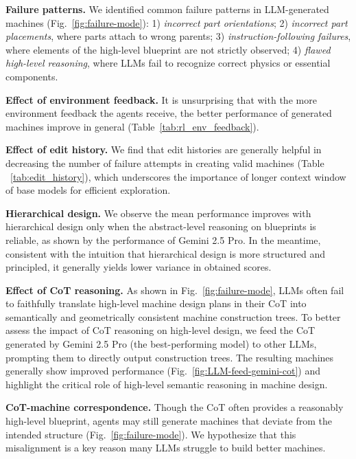 \documentclass{article} %
\theoremstyle{plain}
\theoremstyle{definition}
\begin{document}
\textbf{Failure patterns.} We identified common failure patterns in LLM-generated machines (Fig.~\ref{fig:failure-mode}): 1) \textit{incorrect part orientations}; 2) \textit{incorrect part placements}, where parts attach to wrong parents; 3) \textit{instruction-following failures}, where elements of the high-level blueprint are not strictly observed; 4) \textit{flawed high-level reasoning}, where LLMs fail to recognize correct physics or essential components.



\textbf{Effect of environment feedback.} It is unsurprising that with the more environment feedback the agents receive, the better performance of generated machines improve in general (Table~\ref{tab:rl_env_feedback}).


\textbf{Effect of edit history.} We find that edit histories are generally helpful in decreasing the number of failure attempts in creating valid machines (Table ~\ref{tab:edit_history}), which underscores the importance of longer context window of base models for efficient exploration.


\textbf{Hierarchical design.} We observe the mean performance improves with hierarchical design only when the abstract-level reasoning on blueprints is reliable, as shown by the performance of Gemini 2.5 Pro. In the meantime, consistent with the intuition that hierarchical design is more structured and principled, it generally yields lower variance in obtained scores.


\textbf{Effect of CoT reasoning.} As shown in Fig.~\ref{fig:failure-mode}, LLMs often fail to faithfully translate high-level machine design plans in their CoT into semantically and geometrically consistent machine construction trees. To better assess the impact of CoT reasoning on high-level design, we feed the CoT generated by Gemini 2.5 Pro (the best-performing model) to other LLMs, prompting them to directly output construction trees. The resulting machines generally show improved performance (Fig.~\ref{fig:LLM-feed-gemini-cot}) and highlight the critical role of high-level semantic reasoning in machine design. 

\textbf{CoT-machine correspondence.} Though the CoT often provides a reasonably high-level blueprint, agents may still generate machines that deviate from the intended structure (Fig.~\ref{fig:failure-mode}). We hypothesize that this misalignment is a key reason many LLMs struggle to build better machines.
\end{document}
